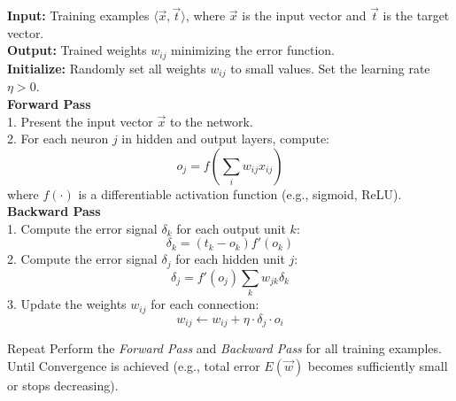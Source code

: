 
\begin{algorithm}
    \caption{Backpropagation Algorithm}
    \begin{algorithmic}
        \textbf{Input:} Training examples $\langle \Vec{x}, \Vec{t} \rangle$, where $\Vec{x}$ is the input vector and $\Vec{t}$ is the target vector. \\
        \textbf{Output:} Trained weights $w_{ij}$ minimizing the error function. \\
        \textbf{Initialize:} Randomly set all weights $w_{ij}$ to small values. Set the learning rate $\eta > 0$. \\
        
        \textbf{Forward Pass} \\
        1. Present the input vector $\Vec{x}$ to the network. \\
        2. For each neuron $j$ in hidden and output layers, compute: \\
        \begin{equation*}
            o_j = f\left(\sum_i w_{ij} x_{ij}\right)
        \end{equation*}
        where $f(\cdot)$ is a differentiable activation function (e.g., sigmoid, ReLU). \\
        
        \textbf{Backward Pass} \\
        1. Compute the error signal $\delta_k$ for each output unit $k$: \\
        \begin{equation*}
            \delta_k = (t_k - o_k) f'(o_k)
        \end{equation*}
        2. Compute the error signal $\delta_j$ for each hidden unit $j$: \\
        \begin{equation*}
            \delta_j = f'(o_j) \sum_k w_{jk} \delta_k
        \end{equation*}
        3. Update the weights $w_{ij}$ for each connection: \\
        \begin{equation*}
            w_{ij} \leftarrow w_{ij} + \eta \cdot \delta_j \cdot o_i
        \end{equation*}

        Repeat
        Perform the \textit{Forward Pass} and \textit{Backward Pass} for all training examples. \\
        Until Convergence is achieved (e.g., total error $E(\Vec{w})$ becomes sufficiently small or stops decreasing).
    \end{algorithmic}
\end{algorithm}
